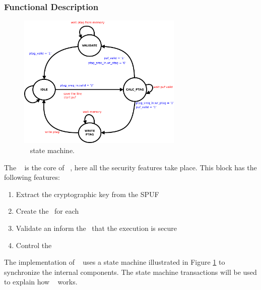 \subsubsection{Functional Description}

\begin{figure}[!ht]
    \centering
    \includegraphics[width=0.70\textwidth]{figures/pdf/sec_engine_sm_no_tree.pdf}
    \caption{\seceng~ state  machine. }
    \label{fig:sesm}
\end{figure}

The \seceng~ is the core of \cshia~, here all the security features take place. This block has the following features: 
\begin{enumerate}
    \item Extract the cryptographic key from the SPUF
    \item Create the \ptags~for each \sline
    \item Validate \ptags an inform the \handler~that the execution is secure
    \item Control the \ptagmem~ 
\end{enumerate}
 The implementation of \seceng~ uses a state machine illustrated in Figure \ref{fig:sesm} to synchronize the internal components. The state machine transactions will be used to explain how \seceng~ works.


